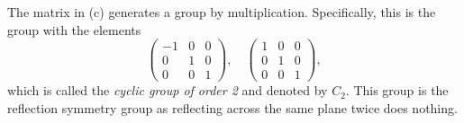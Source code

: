 \documentclass[12pt]{article} %
\begin{document}
\begin{remark}
The matrix in (c) generates a group by multiplication. Specifically, this is the group with the elements
\[
\begin{pmatrix} -1 & 0 & 0 \\ 0 & 1 & 0 \\ 0 & 0 & 1\end{pmatrix}, \quad \begin{pmatrix} 1 & 0 & 0 \\ 0 & 1 & 0 \\ 0 & 0 & 1\end{pmatrix},
\]
which is called the \emph{cyclic group of order 2} and denoted by $C_2$. This group is the reflection symmetry group as reflecting across the same plane twice does nothing.
\end{remark}
\end{document}
